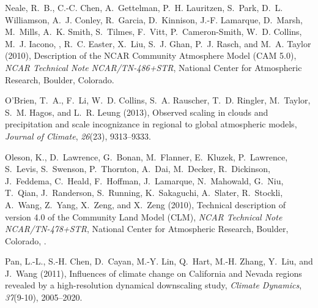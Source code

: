\documentclass[ms]{agutex}   %
\begin{document}
\begin{article}
\begin{thebibliography}{84}
Neale, R.~B., C.-C. Chen, A.~Gettelman, P.~H. Lauritzen, S.~Park, D.~L.
  Williamson, A.~J. Conley, R.~Garcia, D.~Kinnison, J.-F. Lamarque, D.~Marsh,
  M.~Mills, A.~K. Smith, S.~Tilmes, F.~Vitt, P.~Cameron-Smith, W.~D. Collins,
  M.~J. Iacono, , R.~C. Easter, X.~Liu, S.~J. Ghan, P.~J. Rasch, and M.~A.
  Taylor (2010{}), Description of the {NCAR} {C}ommunity
  {A}tmosphere {M}odel ({CAM} 5.0), \textit{NCAR Technical Note
  NCAR/TN-486+STR}, National Center for Atmospheric Research, Boulder,
  Colorado.

O'Brien, T.~A., F.~Li, W.~D. Collins, S.~A. Rauscher, T.~D. Ringler, M.~Taylor,
  S.~M. Hagos, and L.~R. Leung (2013), {Observed scaling in clouds and
  precipitation and scale incognizance in regional to global atmospheric
  models}, \textit{Journal of Climate}, \textit{26}(23), 9313--9333.

Oleson, K., D.~Lawrence, G.~Bonan, M.~Flanner, E.~Kluzek, P.~Lawrence,
  S.~Levis, S.~Swenson, P.~Thornton, A.~Dai, M.~Decker, R.~Dickinson,
  J.~Feddema, C.~Heald, F.~Hoffman, J.~Lamarque, N.~Mahowald, G.~Niu, T.~Qian,
  J.~Randerson, S.~Running, K.~Sakaguchi, A.~Slater, R.~Stockli, A.~Wang,
  Z.~Yang, X.~Zeng, and X.~Zeng (2010), Technical description of version 4.0 of
  the {C}ommunity {L}and {M}odel ({CLM}), \textit{NCAR Technical Note
  NCAR/TN-478+STR}, National Center for Atmospheric Research, Boulder,
  Colorado, .

Pan, L.-L., S.-H. Chen, D.~Cayan, M.-Y. Lin, Q.~Hart, M.-H. Zhang, Y.~Liu, and
  J.~Wang (2011), {Influences of climate change on California and Nevada
  regions revealed by a high-resolution dynamical downscaling study},
  \textit{Climate Dynamics}, \textit{37}(9-10), 2005--2020.


\end{thebibliography}
\end{article}
\end{document}
